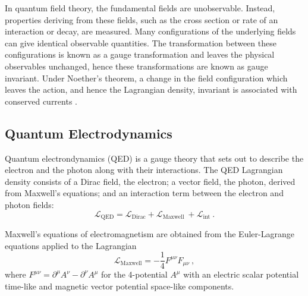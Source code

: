 In quantum field theory, the fundamental fields are unobservable. Instead, properties deriving from these fields, such as the cross section or rate of an interaction or decay, are measured. Many configurations of the underlying fields can give identical observable quantities. The transformation between these configurations is known as a gauge transformation and leaves the physical observables unchanged, hence these transformations are known as gauge invariant. Under Noether's theorem, a change in the field configuration which leaves the action, and hence the Lagrangian density, invariant is associated with conserved currents \cite{doi:10.1080/00411457108231446}.

\subsection{Quantum Electrodynamics}

Quantum electrondynamics (QED) is a gauge theory that sets out to describe the electron and the photon along with their interactions. The QED Lagrangian density consists of a Dirac field, the electron; a vector field, the photon, derived from Maxwell's equations; and an interaction term between the electron and photon fields:
%
\begin{equation}
    \mathcal{L}_{\mathrm{QED}} = \mathcal{L}_{\mathrm{Dirac}} + \mathcal{L}_{\mathrm{Maxwell}}\ + \mathcal{L}_{\mathrm{int}}\ .
\end{equation}

Maxwell's equations of electromagnetism are obtained from the Euler-Lagrange equations applied to the Lagrangian
%
\begin{equation}
    \mathcal{L}_{\mathrm{Maxwell}} = -\frac{1}{4}F^{\mu\nu}F_{\mu\nu}\ ,
\end{equation}
%
where $F^{\mu\nu}=\partial^{\mu}A^{\nu}-\partial^{\nu}A^{\mu}$ \cite{Peskin:1995ev} for the 4-potential $A^{\mu}$ with an electric scalar potential time-like and magnetic vector potential space-like components.

